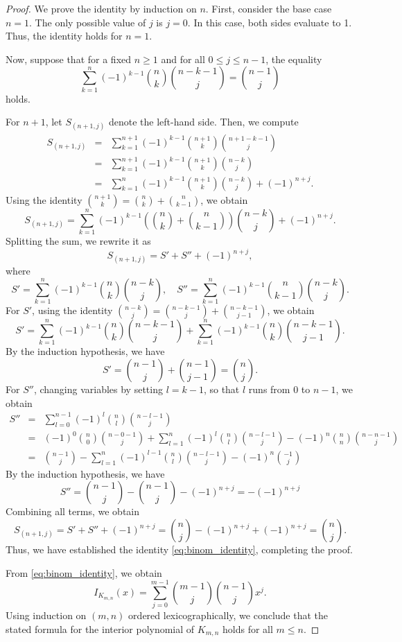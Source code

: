 \documentclass[10pt,a4paper]{amsart}
\begin{document}
\begin{proof}
We prove the identity by induction on $n$. First, consider the base case $n=1$. The only possible value of $j$ is $j=0$. In this case, both sides evaluate to 1. Thus, the identity holds for $n=1$.

Now, suppose that for a fixed $n \geq 1$ and for all $0 \le j \le n-1$, the equality
\[
\sum_{k=1}^{n}(-1)^{k-1}\binom{n}{k}\binom{n-k-1}{j} = \binom{n-1}{j}
\]
holds.

For $ n+1$, let $S_{(n+1,j)}$ denote the left-hand side. Then, we compute
\begin{eqnarray*}
S_{(n+1,j)} &=& \sum_{k=1}^{n+1} (-1)^{k-1}\binom{n+1}{k}\binom{n+1-k-1}{j} \\
&=& \sum_{k=1}^{n+1} (-1)^{k-1}\binom{n+1}{k}\binom{n-k}{j}  \\
&=& \sum_{k=1}^{n} (-1)^{k-1}\binom{n+1}{k}\binom{n-k}{j} + (-1)^{n+j}.
\end{eqnarray*}
Using the identity $\binom{n+1}{k} = \binom{n}{k} + \binom{n}{k-1}$, we obtain
\[
S_{(n+1,j)} = \sum_{k=1}^{n} (-1)^{k-1} \left( \binom{n}{k} + \binom{n}{k-1} \right) \binom{n-k}{j} + (-1)^{n+j}.
\]
Splitting the sum, we rewrite it as
\[
S_{(n+1,j)} = S' + S'' + (-1)^{n+j},
\]
where
\[
S' = \sum_{k=1}^{n} (-1)^{k-1} \binom{n}{k} \binom{n-k}{j}, \quad
S'' = \sum_{k=1}^{n} (-1)^{k-1} \binom{n}{k-1} \binom{n-k}{j}.
\]
For $S'$, using the identity $\binom{n-k}{j} = \binom{n-k-1}{j} + \binom{n-k-1}{j-1}$, we obtain
\[
S' = \sum_{k=1}^{n} (-1)^{k-1} \binom{n}{k} \binom{n-k-1}{j}
+ \sum_{k=1}^{n} (-1)^{k-1} \binom{n}{k} \binom{n-k-1}{j-1}.
\]
By the induction hypothesis, we have
\[
S' = \binom{n-1}{j} + \binom{n-1}{j-1} = \binom{n}{j}.
\]
For $S''$, changing variables by setting $l=k-1$, so that $l$ runs from $0$ to $n-1$, we obtain
\begin{eqnarray*}
S'' 
&=& \sum_{l=0}^{n-1} (-1)^{l}\binom{n}{l}\binom{n-l-1}{j} \\
&=&(-1)^{0}\binom{n}{0}\binom{n-0-1}{j}+\sum_{l=1}^{n} (-1)^{l}\binom{n}{l}\binom{n-l-1}{j}-(-1)^{n}\binom{n}{n}\binom{n-n-1}{j} \\
&=&\binom{n-1}{j}-\sum_{l=1}^{n} (-1)^{l-1}\binom{n}{l}\binom{n-l-1}{j}-(-1)^n\binom{-1}{j}
\end{eqnarray*}
By the induction hypothesis, we have
\[
S''=\binom{n-1}{j}-\binom{n-1}{j}-(-1)^{n+j}=-(-1)^{n+j}
\]
Combining all terms, we obtain
\[
S_{(n+1, j)} =S' + S'' +(-1)^{n+j} 
= \binom{n}{j}-(-1)^{n+j} +(-1)^{n+j} 
= \binom{n}{j}.
\]
Thus, we have established the identity \eqref{eq:binom_identity}, completing the proof.

From \eqref{eq:binom_identity}, we obtain 
\[
I_{K_{m,n}}(x)=\sum_{j=0}^{m-1}\binom{m-1}{j}\binom{n-1}{j}x^j.
\]
Using induction on $(m,n)$ ordered lexicographically, we conclude that the stated formula for the interior polynomial of $K_{m,n}$ holds for all $ m \le n$.
\end{proof}
\end{document}
